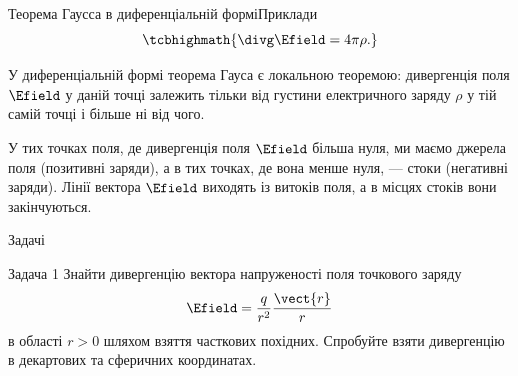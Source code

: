 \documentclass{beamer}
\begin{document}
\begin{frame}{Теорема Гаусса в диференціальній формі}{Приклади}
	\begin{equation*}
		\tcbhighmath{
			\divg\Efield = 4\pi\rho.
		}
	\end{equation*}

	\begin{overprint}
		\begin{block}{}\justifying\small
			У диференціальній формі теорема Гауса є \alert{локальною теоремою}:
			дивергенція поля $\Efield$ у даній точці залежить тільки від густини
			електричного заряду $\rho$ у тій самій точці і більше ні від чого.
			\begin{center}
				
			\end{center}
		\end{block}


		\begin{center}
			
		\end{center}
		\begin{block}{}\justifying\small
			У тих точках поля, де дивергенція поля $\Efield$ \alert{більша нуля}, ми
			маємо \alert{джерела поля} (позитивні заряди), а в тих точках, де вона
			\alert{менше нуля}, --- стоки (негативні заряди). Лінії вектора $\Efield$
			виходять із витоків поля, а в місцях стоків вони закінчуються.
		\end{block}
	\end{overprint}

\end{frame}





\begin{frame}{Задачі}{}
       \begin{exampleblock}{Задача 1}\justifying\small
            Знайти дивергенцію вектора напруженості поля точкового заряду
            \begin{equation*}
                \Efield = \frac{q}{r^2} \frac{\vect{r}}{r}
        \end{equation*}
            в області $r >0$ шляхом взяття часткових похідних.
            Спробуйте взяти дивергенцію в декартових та сферичних координатах.
        \end{exampleblock}
\end{frame}
\end{document}
